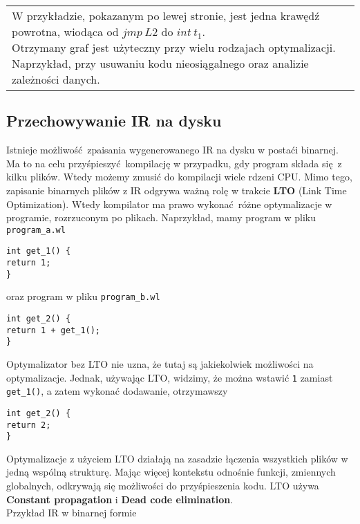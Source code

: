 \begin{center}
\begin{tabularx}{\textwidth}{ L{9cm} L{9cm} }
	W przykładzie, pokazanym po lewej stronie, jest jedna krawędź powrotna, wiodąca od $jmp \ L2$ do
	$int \ t_1$.
	$$$$ %
	Otrzymany graf jest użyteczny przy wielu rodzajach optymalizacji. Naprzykład, przy usuwaniu kodu nieosiągalnego
	oraz analizie zależności danych.

	\end{tabularx}
	\end{center}

\subsection{Przechowywanie IR na dysku}
	Istnieje możliwość zpaisania wygenerowanego IR na dysku w postaći binarnej. Ma to na celu
	przyśpieszyć kompilację w przypadku, gdy program składa się z kilku plików. Wtedy możemy
	zmusić do kompilacji wiele rdzeni CPU. Mimo tego, zapisanie binarnych plików z IR odgrywa
	ważną rolę w trakcie \textbf{LTO} (Link Time Optimization). Wtedy kompilator ma prawo
	wykonać różne optymalizacje w programie, rozrzuconym po plikach. Naprzykład, mamy program
	w pliku \texttt{program_a.wl}

	\begin{lstlisting}[label={lst:warn-unused-var}]
int get_1() {
return 1;
}
	\end{lstlisting}

	oraz program w pliku \texttt{program_b.wl}

	\begin{lstlisting}[label={lst:lto-1}]
int get_2() {
return 1 + get_1();
}
	\end{lstlisting}
	
	Optymalizator bez LTO nie uzna, że tutaj są jakiekolwiek możliwości na optymalizacje. Jednak,
	używając LTO, widzimy, że można wstawić \texttt{1} zamiast \texttt{get\_1()}, a zatem wykonać
	dodawanie, otrzymawszy

	\begin{lstlisting}[label={lst:lto-2}]
int get_2() {
return 2;
}
	\end{lstlisting}
	
	Optymalizacje z użyciem LTO działają na zasadzie łączenia wszystkich plików w jedną wspólną
	strukturę. Mając więcej kontekstu odnośnie funkcji, zmiennych globalnych, odkrywają się
	możliwości do przyśpieszenia kodu. LTO używa \textbf{Constant propagation} i
	\textbf{Dead code elimination}.
	\\

	Przykład IR w binarnej formie

	